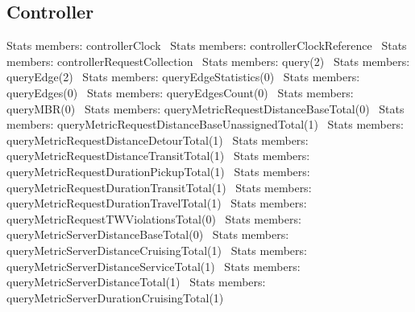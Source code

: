 \subsection{Controller}
\nwenddocs{}\plusendmoddef
\LA{}Stats members: controllerClock~{\nwtagstyle{}}\RA{}
\LA{}Stats members: controllerClockReference~{\nwtagstyle{}}\RA{}
\LA{}Stats members: controllerRequestCollection~{\nwtagstyle{}}\RA{}
\LA{}Stats members: query(2)~{\nwtagstyle{}}\RA{}
\LA{}Stats members: queryEdge(2)~{\nwtagstyle{}}\RA{}
\LA{}Stats members: queryEdgeStatistics(0)~{\nwtagstyle{}}\RA{}
\LA{}Stats members: queryEdges(0)~{\nwtagstyle{}}\RA{}
\LA{}Stats members: queryEdgesCount(0)~{\nwtagstyle{}}\RA{}
\LA{}Stats members: queryMBR(0)~{\nwtagstyle{}}\RA{}
\LA{}Stats members: queryMetricRequestDistanceBaseTotal(0)~{\nwtagstyle{}}\RA{}
\LA{}Stats members: queryMetricRequestDistanceBaseUnassignedTotal(1)~{\nwtagstyle{}}\RA{}
\LA{}Stats members: queryMetricRequestDistanceDetourTotal(1)~{\nwtagstyle{}}\RA{}
\LA{}Stats members: queryMetricRequestDistanceTransitTotal(1)~{\nwtagstyle{}}\RA{}
\LA{}Stats members: queryMetricRequestDurationPickupTotal(1)~{\nwtagstyle{}}\RA{}
\LA{}Stats members: queryMetricRequestDurationTransitTotal(1)~{\nwtagstyle{}}\RA{}
\LA{}Stats members: queryMetricRequestDurationTravelTotal(1)~{\nwtagstyle{}}\RA{}
\LA{}Stats members: queryMetricRequestTWViolationsTotal(0)~{\nwtagstyle{}}\RA{}
\LA{}Stats members: queryMetricServerDistanceBaseTotal(0)~{\nwtagstyle{}}\RA{}
\LA{}Stats members: queryMetricServerDistanceCruisingTotal(1)~{\nwtagstyle{}}\RA{}
\LA{}Stats members: queryMetricServerDistanceServiceTotal(1)~{\nwtagstyle{}}\RA{}
\LA{}Stats members: queryMetricServerDistanceTotal(1)~{\nwtagstyle{}}\RA{}
\LA{}Stats members: queryMetricServerDurationCruisingTotal(1)~{\nwtagstyle{}}\RA{}

